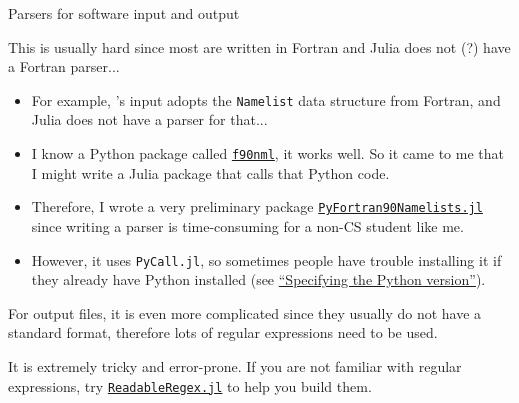 \begin{frame}[allowframebreaks]{Parsers for \ab{} software input and output}

    This is usually hard since most \ab{} are written in Fortran and Julia does not (?)
    have a Fortran parser...

    \framebreak

    \begin{itemize}
        \item For example, \qe{}'s input adopts the \texttt{Namelist} data structure from
              Fortran, and Julia does not have a parser for that...
        \item I know a Python package called
              \href{https://github.com/marshallward/f90nml}{\texttt{f90nml}}, it works well.
              So it came to me that I might write a Julia package that calls that Python
              code.
        \item Therefore, I wrote a very preliminary package
              \href{https://github.com/singularitti/PyFortran90Namelists.jl}{\texttt{PyFortran90Namelists.jl}}
              since writing a parser is time-consuming for a non-CS student like me.
        \item However, it uses \texttt{PyCall.jl}, so sometimes people have trouble installing
              it if they already have Python installed
              (see \href{https://github.com/JuliaPy/PyCall.jl\#specifying-the-python-version}{``Specifying the Python version''}).
    \end{itemize}

    \framebreak

    For output files, it is even more complicated since they usually do not have a standard
    format, therefore lots of regular expressions need to be used.

    It is extremely tricky and error-prone. If you are not familiar with regular expressions,
    try \href{https://github.com/jkrumbiegel/ReadableRegex.jl}{\texttt{ReadableRegex.jl}} to help you build them.

\end{frame}
